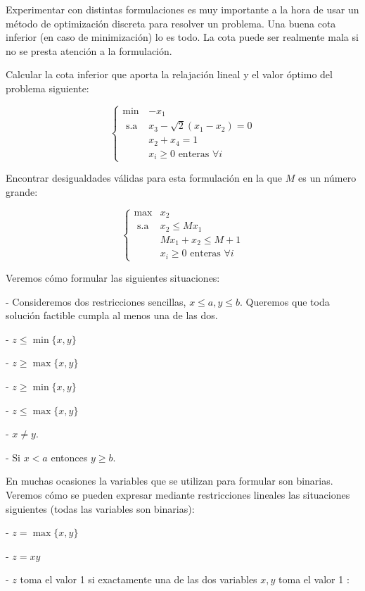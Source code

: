 \documentclass[openany]{book}
\begin{document}
Experimentar con distintas formulaciones es muy importante a la hora de usar un método de optimización discreta para resolver un problema. Una buena cota inferior (en caso de minimización) lo es todo. La cota puede ser realmente mala si no se presta atención a la formulación.

\begin{example}
  Calcular la cota inferior que aporta la relajación lineal y el valor óptimo del problema siguiente:

  $$
  \begin{cases}\min & -x_{1} \\ \text { s.a } & x_{3}-\sqrt{2}\left(x_{1}-x_{2}\right)=0 \\ & x_{2}+x_{4}=1 \\ & x_{i} \geq 0 \text { enteras } \forall i\end{cases}
  $$
\end{example}


\begin{example}
  Encontrar desigualdades válidas para esta formulación en la que $M$ es un número grande:

  $$
  \begin{cases}\max & x_{2} \\ \text { s.a } & x_{2} \leq M x_{1} \\ & M x_{1}+x_{2} \leq M+1 \\ & x_{i} \geq 0 \text { enteras } \forall i\end{cases}
  $$

  Veremos cómo formular las siguientes situaciones:

  - Consideremos dos restricciones sencillas, $x \leq a, y \leq b$. Queremos que toda solución factible cumpla al menos una de las dos.

  - $z \leq \min \{x, y\}$

  - $z \geq \max \{x, y\}$

  - $z \geq \min \{x, y\}$

  - $z \leq \max \{x, y\}$

  - $x \neq y$.

  - Si $x<a$ entonces $y \geq b$.

  En muchas ocasiones la variables que se utilizan para formular son binarias. Veremos cómo se pueden expresar mediante restricciones lineales las situaciones siguientes (todas las variables son binarias):

  - $z=\max \{x, y\}$

  - $z=x y$

  - $z$ toma el valor 1 si exactamente una de las dos variables $x, y$ toma el valor 1 :



\end{example}
\end{document}
